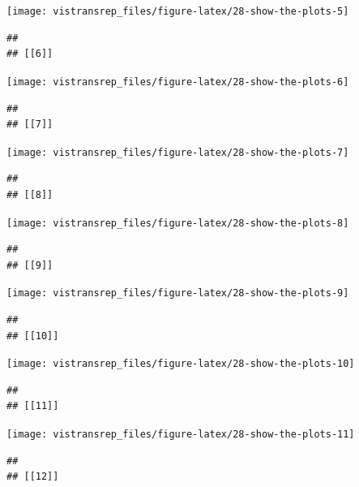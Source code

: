 \documentclass[]{book}
\begin{document}
\begin{flushright}\texttt{[image: vistransrep\_files/figure-latex/28-show-the-plots-5]} \end{flushright}

\begin{verbatim}
## 
## [[6]]
\end{verbatim}

\begin{flushright}\texttt{[image: vistransrep\_files/figure-latex/28-show-the-plots-6]} \end{flushright}

\begin{verbatim}
## 
## [[7]]
\end{verbatim}

\begin{flushright}\texttt{[image: vistransrep\_files/figure-latex/28-show-the-plots-7]} \end{flushright}

\begin{verbatim}
## 
## [[8]]
\end{verbatim}

\begin{flushright}\texttt{[image: vistransrep\_files/figure-latex/28-show-the-plots-8]} \end{flushright}

\begin{verbatim}
## 
## [[9]]
\end{verbatim}

\begin{flushright}\texttt{[image: vistransrep\_files/figure-latex/28-show-the-plots-9]} \end{flushright}

\begin{verbatim}
## 
## [[10]]
\end{verbatim}

\begin{flushright}\texttt{[image: vistransrep\_files/figure-latex/28-show-the-plots-10]} \end{flushright}

\begin{verbatim}
## 
## [[11]]
\end{verbatim}

\begin{flushright}\texttt{[image: vistransrep\_files/figure-latex/28-show-the-plots-11]} \end{flushright}

\begin{verbatim}
## 
## [[12]]
\end{verbatim}
\end{document}
